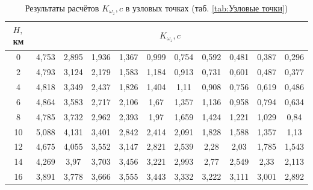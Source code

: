     
    \begin{table}[H]
    \centering
    \caption{Результаты расчётов $K_{\omega_z}, c$ в узловых точках (таб. \ref{tab:Узловые точки})}
    \label{tab:Результаты расчётов K_{omega_z}}
    \begin{tabular}{|c|c|c|c|c|c|c|c|c|c|c|}
    \hline
        $H,$ км &\multicolumn{10}{|c|}{$K_{\omega_z}, c$} \\ \hline
        0 & 4,753 & 2,895 & 1,936 & 1,367 & 0,999 & 0,754 & 0,592 & 0,481 & 0,387 & 0,296  \\ \hline
        2 & 4,793 & 3,124 & 2,179 & 1,583 & 1,184 & 0,913 & 0,731 & 0,601 & 0,487 & 0,377  \\ \hline
        4 & 4,818 & 3,349 & 2,437 & 1,826 & 1,404 & 1,11 & 0,908 & 0,756 & 0,619 & 0,486  \\ \hline
        6 & 4,864 & 3,583 & 2,717 & 2,106 & 1,67 & 1,357 & 1,136 & 0,958 & 0,794 & 0,634  \\ \hline
        8 & 4,785 & 3,732 & 2,962 & 2,393 & 1,97 & 1,659 & 1,424 & 1,221 & 1,029 & 0,84  \\ \hline
        10 & 5,088 & 4,131 & 3,401 & 2,842 & 2,414 & 2,091 & 1,828 & 1,588 & 1,357 & 1,13  \\ \hline
        12 & 4,675 & 4,055 & 3,552 & 3,147 & 2,821 & 2,539 & 2,28 & 2,03 & 1,785 & 1,543  \\ \hline
        14 & 4,269 & 3,97 & 3,703 & 3,456 & 3,221 & 2,993 & 2,77 & 2,549 & 2,33 & 2,113  \\ \hline
        16 & 3,891 & 3,778 & 3,666 & 3,555 & 3,443 & 3,332 & 3,222 & 3,111 & 3,001 & 2,892  \\ \hline
    \end{tabular}
\end{table}

